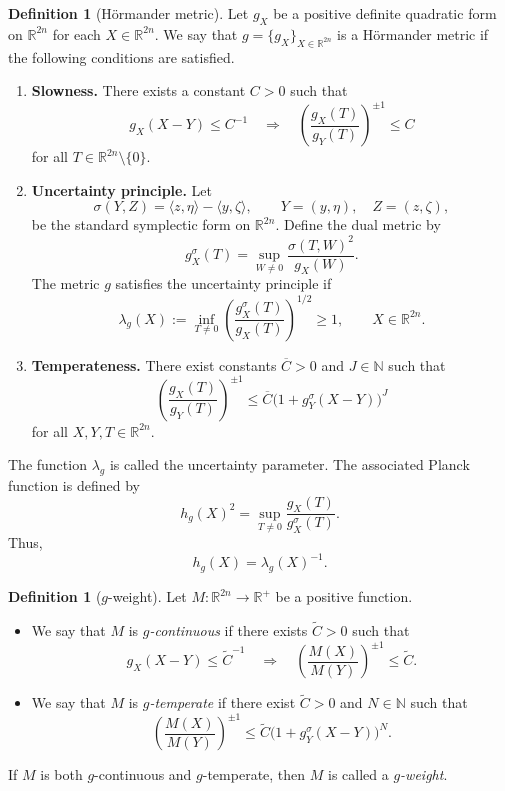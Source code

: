 \documentclass[12pt, reqno]{amsart}
\theoremstyle{definition}
\newtheorem{definition}[theorem]{Definition}
\theoremstyle{remark}
\numberwithin{equation}{section}
\begin{document}
\begin{definition}[H\"ormander metric]
\label{HM}
Let $g_X$ be a positive definite quadratic form on $\mathbb R^{2n}$ for each $X\in\mathbb R^{2n}$. We say that $g=\{g_X\}_{X\in\mathbb R^{2n}}$ is a H\"ormander metric if the following conditions are satisfied.

\begin{enumerate}
\item[\rm I.] \textbf{Slowness.} There exists a constant $C>0$ such that
\[
    g_X(X-Y)\leq C^{-1}
    \quad\Longrightarrow\quad
    \left(\frac{g_X(T)}{g_Y(T)}\right)^{\pm1}\leq C
\]
for all $T\in\mathbb R^{2n}\setminus\{0\}$.

\item[\rm II.] \textbf{Uncertainty principle.} Let
\[
    \sigma(Y,Z)=\langle z,\eta\rangle-\langle y,\zeta\rangle,
    \qquad
    Y=(y,\eta),\quad Z=(z,\zeta),
\]
be the standard symplectic form on $\mathbb R^{2n}$. Define the dual metric by
\[
    g_X^\sigma(T)
    =
    \sup_{W\neq0}
    \frac{\sigma(T,W)^2}{g_X(W)}.
\]
The metric $g$ satisfies the uncertainty principle if
\[
    \lambda_g(X)
    :=
    \inf_{T\neq0}
    \left(
    \frac{g_X^\sigma(T)}{g_X(T)}
    \right)^{1/2}
    \geq 1 ,
    \qquad X\in\mathbb R^{2n}.
\]

\item[\rm III.] \textbf{Temperateness.} There exist constants $\overline C>0$ and $J\in\mathbb N$ such that
\[
    \left(
    \frac{g_X(T)}{g_Y(T)}
    \right)^{\pm1}
    \leq
    \overline C
    \big(1+g_Y^\sigma(X-Y)\big)^J
\]
for all $X,Y,T\in\mathbb R^{2n}$.
\end{enumerate}
\end{definition}

The function $\lambda_g$ is called the uncertainty parameter. The associated Planck function is defined by
\[
    h_g(X)^2
    =
    \sup_{T\neq0}
    \frac{g_X(T)}{g_X^\sigma(T)} .
\]
Thus,
\[
    h_g(X)=\lambda_g(X)^{-1}.
\]

\begin{definition}[$g$-weight]
\label{GW}
Let $M:\mathbb R^{2n}\to\mathbb R^+$ be a positive function.

\begin{itemize}
\item We say that $M$ is {\it $g$-continuous} if there exists $\widetilde C>0$ such that
\[
    g_X(X-Y)\leq \widetilde C^{-1}
    \quad\Longrightarrow\quad
    \left(
    \frac{M(X)}{M(Y)}
    \right)^{\pm1}
    \leq \widetilde C .
\]

\item We say that $M$ is {\it $g$-temperate} if there exist $\widetilde C>0$ and $N\in\mathbb N$ such that
\[
    \left(
    \frac{M(X)}{M(Y)}
    \right)^{\pm1}
    \leq
    \widetilde C
    \big(1+g_Y^\sigma(X-Y)\big)^N .
\]
\end{itemize}
If $M$ is both $g$-continuous and $g$-temperate, then $M$ is called a {\it $g$-weight}.
\end{definition}
\end{document}
